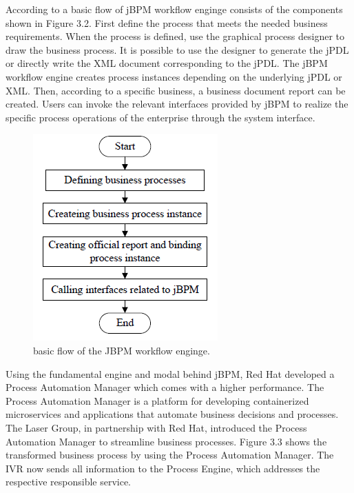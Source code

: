 According to \cite{.2018} a basic flow of jBPM workflow enginge consists of the components shown in Figure 3.2. First
define the process that meets the needed business requirements. When the
process is defined, use the graphical
process designer to draw the business process. It is possible to use the designer
to generate the jPDL or directly write the XML document
corresponding to the jPDL. The jBPM workflow engine creates
process instances depending on the underlying jPDL or XML. Then,
according to a specific business, a business document report
can be created. Users can invoke the relevant interfaces
provided by jBPM to realize the specific process operations of
the enterprise through the system interface.

\begin{figure}[!hb]
	\centering
	\includegraphics[scale=0.85]{jBPMworkflow}
	\caption{basic flow of the JBPM workflow enginge. \cite{.2018}}
\end{figure}
\newpage
Using the fundamental engine and modal behind jBPM, Red Hat developed a Process Automation Manager which comes with a higher performance. The Process Automation Manager is a platform for developing containerized microservices and applications that automate business decisions and processes. \cite{RedHat.2019} The Laser Group, in partnership with Red Hat, introduced the Process Automation Manager to streamline business processes.
Figure 3.3 shows the transformed business process by using the Process Automation Manager.
The \gls{IVR} now sends all information to the Process Engine, which addresses the respective responsible service. \\

